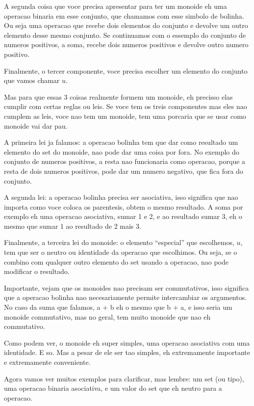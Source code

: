 \documentclass{beamer}
\begin{document}
\begin{frame}
{    A segunda coisa que voce precisa apresentar para ter um monoide eh uma
    operacao binaria em esse conjunto, que chamamos com esse simbolo de bolinha.
    Ou seja uma operacao que recebe dois
    elementos do conjunto e devolve um outro elemento desse mesmo conjunto. Se
    continuamos com o essemplo do conjunto de numeros positivos, a soma, recebe
    dois numeros positivos e devolve outro numero positivo.

    Finalmente, o tercer componente, voce precisa escolher um elemento do conjunto
    que vamos chamar \(u\).

    \hrulefill

    Mas para que essas 3 coisas realmente formem um monoide, eh precisso
    elas  cumplir com certas reglas ou leis. Se voce tem os treis componentes
    mas eles nao cumplem as leis, voce nao tem um monoide, tem uma porcaria que
    se usar como monoide vai dar pau.

    A primeira lei ja falamos: a operacao bolinha tem que dar como resultado um
    elemento do set do monoide, nao pode dar uma coisa por fora. No exemplo do conjunto
    de numeros positivos, a resta nao funcionaria como operacao, porque a resta
    de dois numeros positivos, pode dar um numero negativo, que fica fora do conjunto.

    A segunda lei: a operacao bolinha precisa ser asociativa, isso significa que
    nao importa como voce coloca os parentesis, obtem o mesmo resultado. A soma
    por exemplo eh uma operacao asociativa, sumar 1 e 2, e ao resultado sumar 3,
    eh o mesmo que sumar 1 ao resultado de 2 mais 3.

    Finalmente, a terceira lei do monoide: o elemento ``especial'' que
    escolhemos, \(u\), tem que ser o neutro ou identidade da operacao que
    escolhimos. Ou seja, se o combino com qualquer outro elemento do set usando
    a operacao, nao pode modificar o resultado.

    Importante, vejam que os monoides nao precisam ser commutativos, isso
    significa que a operacao bolinha nao necesariamente permite intercambiar os
    argumentos. No caso da suma que falamos, a + b eh o mesmo que b + a, e isso
    seria um monoide commutativo, mas no geral, tem muito monoide que nao eh commutativo.

    Como podem ver, o monoide eh super simples, uma operacao asociativa com uma
    identidade. E so. Mas a pesar de ele ser tao simples, eh extremamente
    importante e extremamente conveniente.

    Agora vamos ver muitos exemplos para clarificar, mas lembre: um set (ou
    tipo), uma operacao binaria asociativa, e um valor do set que eh neutro para
    a operacao.
  }
\end{frame}
\end{document}
